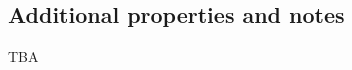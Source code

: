 \documentclass[sigconf]{acmart}
\theoremstyle{definition}
\begin{document}










\subsection{Additional properties and notes}
 
 TBA



\end{document}
